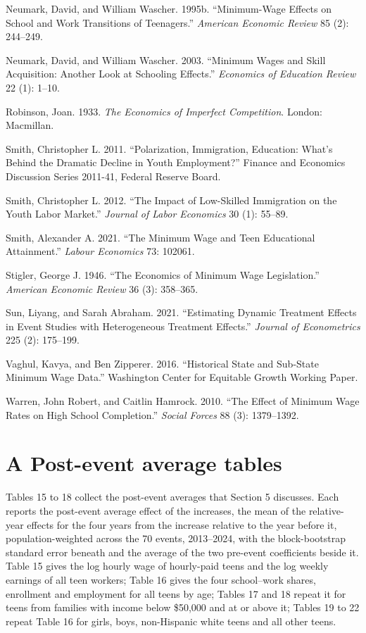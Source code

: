 \documentclass[12pt]{article}
\begin{document}
\noindent Neumark, David, and William Wascher. 1995b. ``Minimum-Wage Effects on School and Work Transitions of Teenagers.'' \textit{American Economic Review} 85 (2): 244--249.

\noindent Neumark, David, and William Wascher. 2003. ``Minimum Wages and Skill Acquisition: Another Look at Schooling Effects.'' \textit{Economics of Education Review} 22 (1): 1--10.

\noindent Robinson, Joan. 1933. \textit{The Economics of Imperfect Competition}. London: Macmillan.

\noindent Smith, Christopher L. 2011. ``Polarization, Immigration, Education: What's Behind the Dramatic Decline in Youth Employment?'' Finance and Economics Discussion Series 2011-41, Federal Reserve Board.

\noindent Smith, Christopher L. 2012. ``The Impact of Low-Skilled Immigration on the Youth Labor Market.'' \textit{Journal of Labor Economics} 30 (1): 55--89.

\noindent Smith, Alexander A. 2021. ``The Minimum Wage and Teen Educational Attainment.'' \textit{Labour Economics} 73: 102061.

\noindent Stigler, George J. 1946. ``The Economics of Minimum Wage Legislation.'' \textit{American Economic Review} 36 (3): 358--365.

\noindent Sun, Liyang, and Sarah Abraham. 2021. ``Estimating Dynamic Treatment Effects in Event Studies with Heterogeneous Treatment Effects.'' \textit{Journal of Econometrics} 225 (2): 175--199.

\noindent Vaghul, Kavya, and Ben Zipperer. 2016. ``Historical State and Sub-State Minimum Wage Data.'' Washington Center for Equitable Growth Working Paper.

\noindent Warren, John Robert, and Caitlin Hamrock. 2010. ``The Effect of Minimum Wage Rates on High School Completion.'' \textit{Social Forces} 88 (3): 1379--1392.




\appendix
\section{A Post-event average tables}

Tables 15 to 18 collect the post-event averages that Section 5 discusses. Each reports the post-event average effect of the increases, the mean of the relative-year effects for the four years from the increase relative to the year before it, population-weighted across the 70 events, 2013--2024, with the block-bootstrap standard error beneath and the average of the two pre-event coefficients beside it. Table 15 gives the log hourly wage of hourly-paid teens and the log weekly earnings of all teen workers; Table 16 gives the four school--work shares, enrollment and employment for all teens by age; Tables 17 and 18 repeat it for teens from families with income below \$50,000 and at or above it; Tables 19 to 22 repeat Table 16 for girls, boys, non-Hispanic white teens and all other teens.
\end{document}
